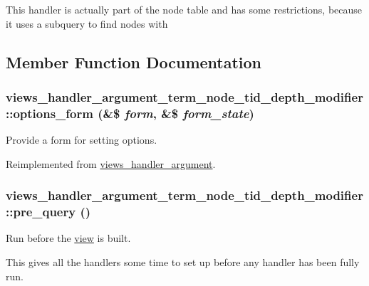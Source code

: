 This handler is actually part of the node table and has some restrictions, because it uses a subquery to find nodes with 

\subsection{Member Function Documentation}
\hypertarget{classviews__handler__argument__term__node__tid__depth__modifier_a4796e763923377f41dbf9bf415d96e8}{
\subsubsection[{options\_\-form}]{\setlength{\rightskip}{0pt plus 5cm}views\_\-handler\_\-argument\_\-term\_\-node\_\-tid\_\-depth\_\-modifier::options\_\-form (\&\$ {\em form}, \/  \&\$ {\em form\_\-state})}}
\label{classviews__handler__argument__term__node__tid__depth__modifier_a4796e763923377f41dbf9bf415d96e8}


Provide a form for setting options. 

Reimplemented from \hyperlink{classviews__handler__argument_44f015a0d527983ae6df2689f66b2c24}{views\_\-handler\_\-argument}.\hypertarget{classviews__handler__argument__term__node__tid__depth__modifier_278abcb2e424241efa1361d01be89eb1}{
\subsubsection[{pre\_\-query}]{\setlength{\rightskip}{0pt plus 5cm}views\_\-handler\_\-argument\_\-term\_\-node\_\-tid\_\-depth\_\-modifier::pre\_\-query ()}}
\label{classviews__handler__argument__term__node__tid__depth__modifier_278abcb2e424241efa1361d01be89eb1}


Run before the \hyperlink{classview}{view} is built.

This gives all the handlers some time to set up before any handler has been fully run. 

